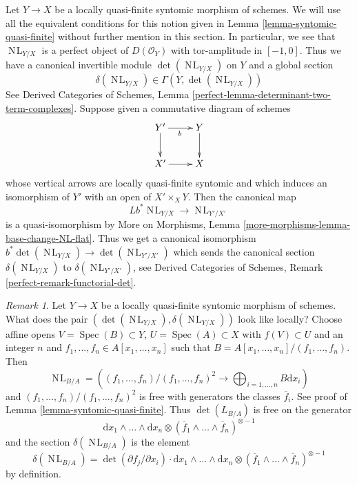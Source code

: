 \documentclass{stacks-project}
\theoremstyle{plain}
\theoremstyle{definition}
\theoremstyle{remark}
\newtheorem{remark}[subsection]{Remark}
\numberwithin{equation}{subsection}
\def\Spec{\mathop{\mathrm{Spec}}}
\def\NL{\mathop{N\!L}\nolimits}
\begin{document}
\medskip\noindent
Let $Y \to X$ be a locally quasi-finite syntomic morphism of schemes.
We will use all the equivalent conditions for this notion given in
Lemma \ref{lemma-syntomic-quasi-finite} without further mention in
this section. In particular, we see that $\NL_{Y/X}$ is a perfect
object of $D(\mathcal{O}_Y)$ with tor-amplitude in $[-1, 0]$. Thus
we have a canonical invertible module
$\det(\NL_{Y/X})$ on $Y$ and a global section
$$
\delta(\NL_{Y/X}) \in \Gamma(Y, \det(\NL_{Y/X}))
$$
See Derived Categories of Schemes, Lemma
\ref{perfect-lemma-determinant-two-term-complexes}.
Suppose given a commutative diagram of schemes
$$
\xymatrix{
Y' \ar[r]_b \ar[d] & Y \ar[d] \\
X' \ar[r] & X
}
$$
whose vertical arrows are locally quasi-finite syntomic and which
induces an isomorphism of $Y'$ with an open of $X' \times_X Y$.
Then the canonical map
$$
Lb^*\NL_{Y/X} \longrightarrow \NL_{Y'/X'}
$$
is a quasi-isomorphism by
More on Morphisms, Lemma \ref{more-morphisms-lemma-base-change-NL-flat}.
Thus we get a canonical isomorphism
$b^*\det(\NL_{Y/X}) \to \det(\NL_{Y'/X'})$ which sends the
canonical section $\delta(\NL_{Y/X})$ to $\delta(\NL_{Y'/ X'})$, see
Derived Categories of Schemes, Remark \ref{perfect-remark-functorial-det}.

\begin{remark}
\label{remark-local-description-delta}
Let $Y \to X$ be a locally quasi-finite syntomic morphism of schemes.
What does the pair $(\det(\NL_{Y/X}), \delta(\NL_{Y/X}))$ look
like locally? Choose affine opens $V = \Spec(B) \subset Y$,
$U = \Spec(A) \subset X$ with $f(V) \subset U$ and an integer $n$ and
$f_1, \ldots, f_n \in A[x_1, \ldots, x_n]$ such that
$B = A[x_1, \ldots, x_n]/(f_1, \ldots, f_n)$. Then
$$
\NL_{B/A} = \left(
(f_1, \ldots, f_n)/(f_1, \ldots, f_n)^2
\longrightarrow
\bigoplus\nolimits_{i = 1, \ldots, n} B \text{d} x_i\right)
$$
and $(f_1, \ldots, f_n)/(f_1, \ldots, f_n)^2$ is free with generators
the classes $\overline{f}_i$. See proof of
Lemma \ref{lemma-syntomic-quasi-finite}.
Thus $\det(L_{B/A})$ is free on the generator
$$
\text{d}x_1 \wedge \ldots \wedge \text{d}x_n
\otimes
(\overline{f}_1 \wedge \ldots \wedge \overline{f}_n)^{\otimes -1}
$$
and the section $\delta(\NL_{B/A})$ is the element
$$
\delta(\NL_{B/A}) =
\det(\partial f_j/ \partial x_i) \cdot
\text{d}x_1 \wedge \ldots \wedge \text{d}x_n
\otimes
(\overline{f}_1 \wedge \ldots \wedge \overline{f}_n)^{\otimes -1}
$$
by definition.
\end{remark}
\end{document}
